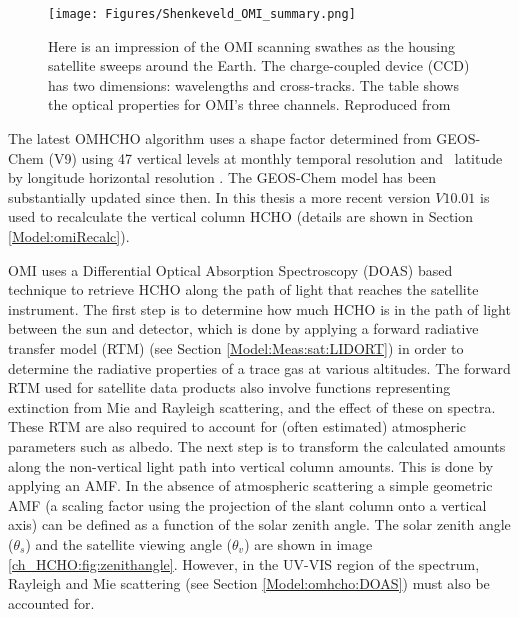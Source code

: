   \begin{figure}
    \texttt{[image: Figures/Shenkeveld\_OMI\_summary.png]}
    \caption{ %
      Here is an impression of the OMI scanning swathes as the housing satellite sweeps around the Earth.
      The charge-coupled device (CCD) has two dimensions: wavelengths and cross-tracks.
      The table shows the optical properties for OMI's three channels.
      Reproduced from \textcite{Schenkeveld2017}
    }\label{LR:HCHO:Sat:fig_Shenkeveld_OMI_summary}
  \end{figure}
  
  The latest OMHCHO algorithm uses a shape factor determined from GEOS-Chem (V9) using 47 vertical levels at monthly temporal resolution and \lowhr ~latitude by longitude horizontal resolution \parencite{Abad2015}.
  The GEOS-Chem model has been substantially updated since then.
  In this thesis a more recent version $V10.01$ is used to recalculate the vertical column HCHO (details are shown in Section \ref{Model:omiRecalc}).
  
  OMI uses a Differential Optical Absorption Spectroscopy (DOAS) based technique to retrieve HCHO along the path of light that reaches the satellite instrument.
  The first step is to determine how much HCHO is in the path of light between the sun and detector, which is done by applying a forward radiative transfer model (RTM) (see Section \ref{Model:Meas:sat:LIDORT}) in order to determine the radiative properties of a trace gas at various altitudes.
  The forward RTM used for satellite data products also involve functions representing extinction from Mie and Rayleigh scattering, and the effect of these on spectra.
  These RTM are also required to account for (often estimated) atmospheric parameters such as albedo.
  The next step is to transform the calculated amounts along the non-vertical light path into vertical column amounts.
  This is done by applying an AMF.
  In the absence of atmospheric scattering a simple geometric AMF (a scaling factor using the projection of the slant column onto a vertical axis) can be defined as a function of the solar zenith angle. 
  The solar zenith angle ($\theta_s$) and the satellite viewing angle ($\theta_v$) are shown in image \ref{ch_HCHO:fig:zenithangle}.
  However, in the UV-VIS region of the spectrum, Rayleigh and Mie scattering (see Section \ref{Model:omhcho:DOAS}) must also be accounted for.
  
